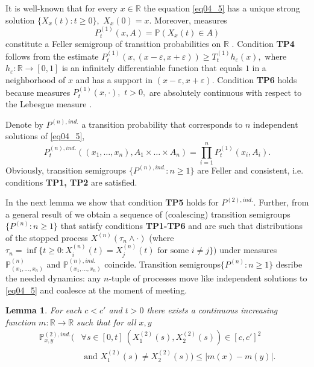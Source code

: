 \documentclass[a4paper,12pt]{article}
\newcommand{\1}{1\!\!\,{\rm I}}
\theoremstyle{plain}
\newtheorem{lemma}{Lemma}[section]
\begin{document}
It is well-known \cite[Ch. V, Th. (11.2)]{RW2} that for every $x\in\mathbb{R}$ the equation \eqref{eq04_5} has a unique strong solution $\{X_x(t):t\geq 0\},$ $X_x(0)=x.$ Moreover, measures 
\begin{equation}
\label{eq04_6}
P^{(1)}_t(x,A)=\mathbb{P}(X_x(t)\in A)
\end{equation}
constitute a Feller semigroup of transition probabilities on $\mathbb{R}$ \cite[Ch. V, Th. (24.1)]{RW2}. Condition {\bf TP4} follows from the estimate $P^{(1)}_t(x,(x-\varepsilon,x+\varepsilon))\geq T^{(1)}_t h_\varepsilon(x),$ where $h_\varepsilon:\mathbb{R}\to[0,1]$ is an infinitely differentiable function that equals $1$ in a neighborhood of $x$ and has a support in $(x-\varepsilon,x+\varepsilon).$ Condition {\bf TP6} holds because measures $P^{(1)}_t(x,\cdot),$ $t>0,$ are absolutely continuous with respect to the Lebesgue measure \cite[Cor. 10.1.4]{SV}.

Denote by $P^{(n),ind.}$ a transition probability that corresponds to $n$ independent solutions of \eqref{eq04_5},
\begin{equation}
\label{eq04_7}
P^{(n),ind.}_t((x_1,\ldots,x_n),A_1\times \ldots \times A_n)=\prod^n_{i=1} P^{(1)}_t(x_i,A_i).
\end{equation}
Obviously, transition semigroups $\{P^{(n),ind.}:n\geq 1\}$ are Feller and consistent, i.e. conditions {\bf TP1, TP2} are satisfied. 

In the next lemma we show that condition {\bf TP5} holds for $P^{(2),ind.}.$ Further, from a general result of \cite{LJR} we obtain a sequence of (coalescing) transition semigroups $\{P^{(n)}:n\geq 1\}$ that satisfy conditions {\bf TP1-TP6} and are such that distributions of the stopped process  $X^{(n)}(\tau_n\wedge \cdot)$ (where $\tau_n=\inf\{t\geq 0: X^{(n)}_i(t)=X^{(n)}_j(t) \mbox{ for some } i\ne j\})$ under measures $\mathbb{P}^{(n)}_{(x_1,\ldots,x_n)}$ and $\mathbb{P}^{(n),ind.}_{(x_1,\ldots,x_n)}$ coincide. Transition semigroups$\{P^{(n)}:n\geq 1\}$ desribe the needed dynamics: any $n$-tuple of processes move like independent solutions to \eqref{eq04_5} and coalesce at the moment of meeting.

\begin{lemma}
	\label{lem5} For each $c<c'$ and $t>0$ there exists a continuous increasing function $m:\mathbb{R}\to\mathbb{R}$ such that for all $x,y$
	$$
	\begin{aligned}
	\mathbb{P}^{(2),ind.}_{x,y}(& \forall s\in[0,t] \ (X^{(2)}_1(s),X^{(2)}_2(s))\in[c,c']^2\\
	& \mbox{ and } X^{(2)}_1(s)\ne X^{(2)}_2(s))\leq |m(x)-m(y)|.
	\end{aligned}
	$$
\end{lemma}
\end{document}
